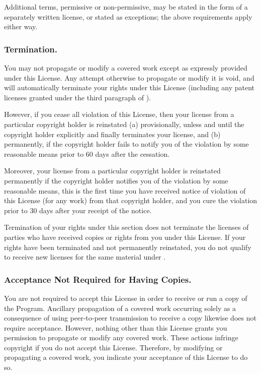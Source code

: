 \documentclass[10pt,english]{article}
\begin{document}
Additional terms, permissive or non-permissive, may be stated in the
form of a separately written license, or stated as exceptions; the
above requirements apply either way.


\subsubsection{Termination.}

You may not propagate or modify a covered work except as expressly
provided under this License. Any attempt otherwise to propagate or
modify it is void, and will automatically terminate your rights under
this License (including any patent licenses granted under the third
paragraph of ).

However, if you cease all violation of this License, then your license
from a particular copyright holder is reinstated (a) provisionally,
unless and until the copyright holder explicitly and finally terminates
your license, and (b) permanently, if the copyright holder fails to
notify you of the violation by some reasonable means prior to 60 days
after the cessation.

Moreover, your license from a particular copyright holder is reinstated
permanently if the copyright holder notifies you of the violation
by some reasonable means, this is the first time you have received
notice of violation of this License (for any work) from that copyright
holder, and you cure the violation prior to 30 days after your receipt
of the notice.

Termination of your rights under this section does not terminate the
licenses of parties who have received copies or rights from you under
this License. If your rights have been terminated and not permanently
reinstated, you do not qualify to receive new licenses for the same
material under .


\subsubsection{Acceptance Not Required for Having Copies.\label{sub:Acceptance-Not-Required}}

You are not required to accept this License in order to receive or
run a copy of the Program. Ancillary propagation of a covered work
occurring solely as a consequence of using peer-to-peer transmission
to receive a copy likewise does not require acceptance. However, nothing
other than this License grants you permission to propagate or modify
any covered work. These actions infringe copyright if you do not accept
this License. Therefore, by modifying or propagating a covered work,
you indicate your acceptance of this License to do so.
\end{document}
